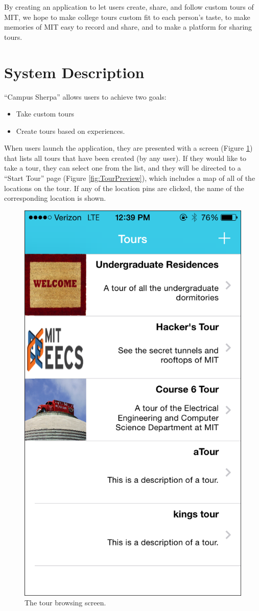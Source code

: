 \documentclass{sigchi}
\begin{document}
By creating an application to let users create, share, and follow custom tours of MIT, we hope to make college tours custom fit to each person's taste, to make memories of MIT easy to record and share, and to make a platform for sharing tours.

\section{System Description}

``Campus Sherpa'' allows users to achieve two goals: 

\begin{itemize}
	\item Take custom tours
	\item Create tours based on experiences.
\end{itemize}

When users launch the application, they are presented with a screen (Figure \ref{fig:TourBrowser}) that lists all tours that have been created (by any user). If they would like to take a tour, they can select one from the list, and they will be directed to a ``Start Tour'' page (Figure \ref{fig:TourPreview}), which includes a map of all of the locations on the tour. If any of the location pins are clicked, the name of the corresponding location is shown.

\begin{figure}
\centering
\includegraphics[width=0.7\linewidth]{./TourBrowser}
\caption{The tour browsing screen.}
\label{fig:TourBrowser}
\end{figure}
\end{document}
